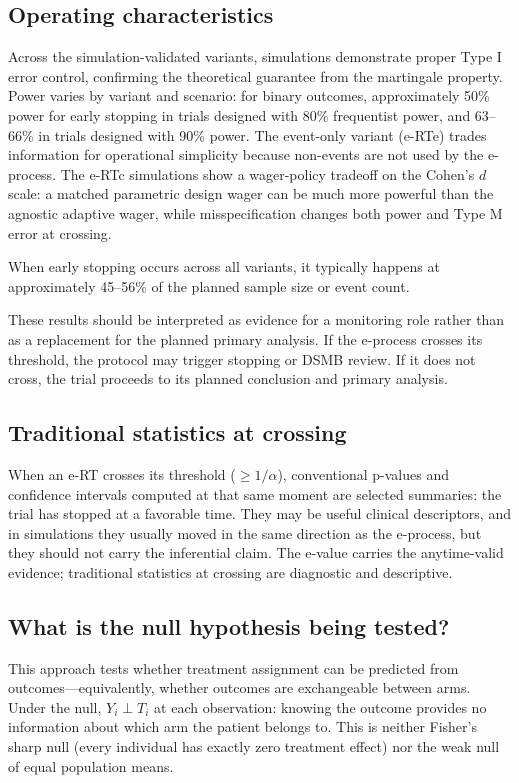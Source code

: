 \documentclass[10pt]{article}
\begin{document}
\subsection{Operating characteristics}

Across the simulation-validated variants, simulations demonstrate proper Type I error control, confirming the theoretical guarantee from the martingale property. Power varies by variant and scenario: for binary outcomes, approximately 50\% power for early stopping in trials designed with 80\% frequentist power, and 63--66\% in trials designed with 90\% power. The event-only variant (e-RTe) trades information for operational simplicity because non-events are not used by the e-process. The e-RTc simulations show a wager-policy tradeoff on the Cohen's $d$ scale: a matched parametric design wager can be much more powerful than the agnostic adaptive wager, while misspecification changes both power and Type M error at crossing.

When early stopping occurs across all variants, it typically happens at approximately 45--56\% of the planned sample size or event count.

These results should be interpreted as evidence for a monitoring role rather than as a replacement for the planned primary analysis. If the e-process crosses its threshold, the protocol may trigger stopping or DSMB review. If it does not cross, the trial proceeds to its planned conclusion and primary analysis.

\subsection{Traditional statistics at crossing}

When an e-RT crosses its threshold ($\geq 1/\alpha$), conventional p-values and confidence intervals computed at that same moment are selected summaries: the trial has stopped at a favorable time. They may be useful clinical descriptors, and in simulations they usually moved in the same direction as the e-process, but they should not carry the inferential claim. The e-value carries the anytime-valid evidence; traditional statistics at crossing are diagnostic and descriptive.

\subsection{What is the null hypothesis being tested?}

This approach tests whether treatment assignment can be predicted from outcomes---equivalently, whether outcomes are exchangeable between arms. Under the null, $Y_i \perp T_i$ at each observation: knowing the outcome provides no information about which arm the patient belongs to. This is neither Fisher's sharp null (every individual has exactly zero treatment effect) nor the weak null of equal population means.
\end{document}
